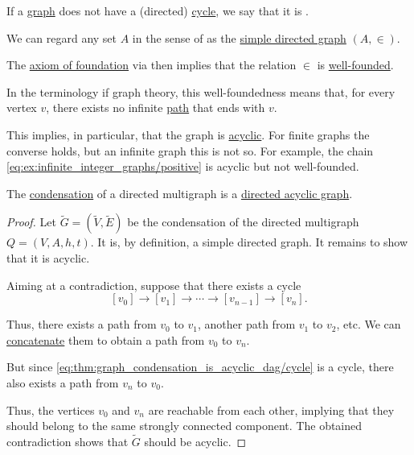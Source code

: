 \begin{definition}\label{def:acyclic_graph}
  If a \hyperref[rem:arbitrary_graph]{graph} does not have a (directed) \hyperref[def:graph_cycle]{cycle}, we say that it is .
\end{definition}

\begin{example}\label{ex:well_founded_graphs}
  We can regard any set \( A \) in the sense of \hyperref[def:zfc]{} as the \hyperref[def:directed_graph]{simple directed graph} \( (A, \in) \).

  The \hyperref[def:zfc/foundation]{axiom of foundation} via  then implies that the relation \( \in \) is \hyperref[def:well_founded_relation]{well-founded}.

  In the terminology if graph theory, this well-foundedness means that, for every vertex \( v \), there exists no infinite \hyperref[def:graph_walk/path]{path} that ends with \( v \).

  This implies, in particular, that the graph is \hyperref[def:acyclic_graph]{acyclic}. For finite graphs the converse holds, but an infinite graph this is not so. For example, the chain \eqref{eq:ex:infinite_integer_graphs/positive} is acyclic but not well-founded.
\end{example}

\begin{proposition}\label{thm:graph_condensation_is_acyclic_dag}
  The \hyperref[def:directed_graph_condensation]{condensation} of a directed multigraph is a \hyperref[def:acyclic_graph]{directed acyclic graph}.
\end{proposition}
\begin{proof}
  Let \( \widetilde{G} = (\widetilde{V}, \widetilde{E}) \) be the condensation of the directed multigraph \( Q = (V, A, h, t) \). It is, by definition, a simple directed graph. It remains to show that it is acyclic.

  Aiming at a contradiction, suppose that there exists a cycle
  \begin{equation}\label{eq:thm:graph_condensation_is_acyclic_dag/cycle}
    [v_0] \to [v_1] \to \cdots \to [v_{n-1}] \to [v_n].
  \end{equation}

  Thus, there exists a path from \( v_0 \) to \( v_1 \), another path from \( v_1 \) to \( v_2 \), etc. We can \hyperref[def:graph_walk/concatenation]{concatenate} them to obtain a path from \( v_0 \) to \( v_n \).

  But since \eqref{eq:thm:graph_condensation_is_acyclic_dag/cycle} is a cycle, there also exists a path from \( v_n \) to \( v_0 \).

  Thus, the vertices \( v_0 \) and \( v_n \) are reachable from each other, implying that they should belong to the same strongly connected component. The obtained contradiction shows that \( \widetilde{G} \) should be acyclic.
\end{proof}
